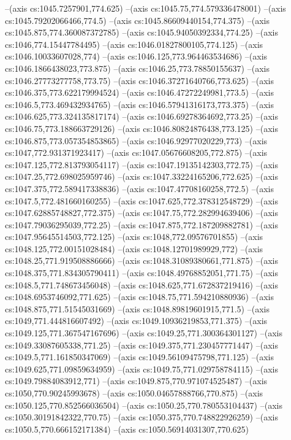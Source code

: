 --(axis cs:1045.7257901,774.625)
--(axis cs:1045.75,774.579336478001)
--(axis cs:1045.79202066466,774.5)
--(axis cs:1045.86609440154,774.375)
--(axis cs:1045.875,774.360087372785)
--(axis cs:1045.94050392334,774.25)
--(axis cs:1046,774.15447784495)
--(axis cs:1046.01827800105,774.125)
--(axis cs:1046.10033607028,774)
--(axis cs:1046.125,773.964463534686)
--(axis cs:1046.1866438023,773.875)
--(axis cs:1046.25,773.78850155637)
--(axis cs:1046.27773277758,773.75)
--(axis cs:1046.37271640766,773.625)
--(axis cs:1046.375,773.622179994524)
--(axis cs:1046.47272249981,773.5)
--(axis cs:1046.5,773.469432934765)
--(axis cs:1046.57941316173,773.375)
--(axis cs:1046.625,773.324135817174)
--(axis cs:1046.69278364692,773.25)
--(axis cs:1046.75,773.188663729126)
--(axis cs:1046.80824876438,773.125)
--(axis cs:1046.875,773.057354853865)
--(axis cs:1046.92977020229,773)
--(axis cs:1047,772.931371923417)
--(axis cs:1047.05676608205,772.875)
--(axis cs:1047.125,772.813793054117)
--(axis cs:1047.19135142303,772.75)
--(axis cs:1047.25,772.698025959746)
--(axis cs:1047.33224165206,772.625)
--(axis cs:1047.375,772.589417338836)
--(axis cs:1047.47708160258,772.5)
--(axis cs:1047.5,772.481660160255)
--(axis cs:1047.625,772.378312548729)
--(axis cs:1047.62885748827,772.375)
--(axis cs:1047.75,772.282994639406)
--(axis cs:1047.79036295039,772.25)
--(axis cs:1047.875,772.187209882781)
--(axis cs:1047.95645514503,772.125)
--(axis cs:1048,772.09576701855)
--(axis cs:1048.125,772.00151028484)
--(axis cs:1048.12701989929,772)
--(axis cs:1048.25,771.919508886666)
--(axis cs:1048.31089380661,771.875)
--(axis cs:1048.375,771.834305790411)
--(axis cs:1048.49768852051,771.75)
--(axis cs:1048.5,771.748673456048)
--(axis cs:1048.625,771.672837219416)
--(axis cs:1048.6953746092,771.625)
--(axis cs:1048.75,771.594210880936)
--(axis cs:1048.875,771.51545031669)
--(axis cs:1048.89819601915,771.5)
--(axis cs:1049,771.444816607492)
--(axis cs:1049.10936219853,771.375)
--(axis cs:1049.125,771.367547167696)
--(axis cs:1049.25,771.300364301127)
--(axis cs:1049.33087605338,771.25)
--(axis cs:1049.375,771.230457771447)
--(axis cs:1049.5,771.161850347069)
--(axis cs:1049.56109475798,771.125)
--(axis cs:1049.625,771.09859634959)
--(axis cs:1049.75,771.029758784115)
--(axis cs:1049.79884083912,771)
--(axis cs:1049.875,770.971074525487)
--(axis cs:1050,770.90245993678)
--(axis cs:1050.04657888766,770.875)
--(axis cs:1050.125,770.852566036504)
--(axis cs:1050.25,770.780553104437)
--(axis cs:1050.30191842322,770.75)
--(axis cs:1050.375,770.748822926259)
--(axis cs:1050.5,770.666152171384)
--(axis cs:1050.56914031307,770.625)
